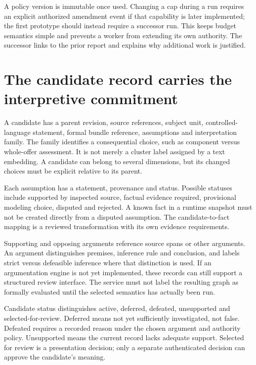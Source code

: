 \documentclass[12pt,a4paper,oneside,openany]{book}
\begin{document}
A policy version is immutable once used. Changing a cap during a run requires an
explicit authorized amendment event if that capability is later implemented;
the first prototype should instead require a successor run. This keeps budget
semantics simple and prevents a worker from extending its own authority. The
successor links to the prior report and explains why additional work is justified.

\section{The candidate record carries the interpretive commitment}
\label{merge:M08:03}


A candidate has a parent revision, source references, subject unit, controlled-
language statement, formal bundle reference, assumptions and interpretation
family. The family identifies a consequential choice, such as component versus
whole-offer assessment. It is not merely a cluster label assigned by a text
embedding. A candidate can belong to several dimensions, but its changed choices
must be explicit relative to its parent.

Each assumption has a statement, provenance and status. Possible statuses include
supported by inspected source, factual evidence required, provisional modeling
choice, disputed and rejected. A known fact in a runtime snapshot must not be
created directly from a disputed assumption. The candidate-to-fact mapping is a
reviewed transformation with its own evidence requirements.

Supporting and opposing arguments reference source spans or other arguments.
An argument distinguishes premises, inference rule and conclusion, and labels
strict versus defeasible inference where that distinction is used. If an
argumentation engine is not yet implemented, these records can still support a
structured review interface. The service must not label the resulting graph as
formally evaluated until the selected semantics has actually been run.

Candidate status distinguishes active, deferred, defeated, unsupported and
selected-for-review. Deferred means not yet sufficiently investigated, not false.
Defeated requires a recorded reason under the chosen argument and authority
policy. Unsupported means the current record lacks adequate support. Selected
for review is a presentation decision; only a separate authenticated decision can
approve the candidate's meaning.
\end{document}
